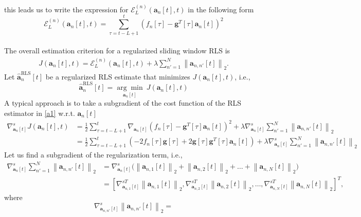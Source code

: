 \documentclass[11pt,final,onecolumn]{IEEEtran}
\begin{document}
\begin{itemize}
this leads us to write the expression for $\mathcal{E}_L^{(n)}(\bm a_n[t],t)$ in the following form
\begin{equation}
\mathcal{E}_L^{(n)}(\bm a_n[t],t)=\sum_{\tau=t-L+1}^{t}\left ( f_n[\tau]- \bm g^T[\tau] \bm a_n[t] \right )^2
\end{equation}\\


The overall estimation criterion for a regularized sliding window RLS  is
\begin{align}
J(\bm a_n[t],t)= \mathcal{E}_L^{(n)}(\bm a_n[t],t)+\lambda \sum_{n'=1}^{N} \left \lVert \bm a_{n,n'}[t]\right\rVert_2. \label{a1}
\end{align}
Let $\hat{\bm a}_n^{\text{RLS}}[t]$ be a regularized RLS estimate that minimizes $J(\bm a_n[t],t)$, i.e.,
\begin{equation}\label{key}
\hat{\bm a}_n^{\text{RLS}}[t]=\underset{\bm a_n[t]}{\arg\min}~J(\bm a_n[t],t)
\end{equation}
A typical approach is to take a subgradient of the cost function of the RLS estimator in \eqref{a1}  w.r.t. $\bm a_n[t]$
\begin{align}\label{key}
\nabla_{\bm a_n[t]}^{s}J(\bm a_n[t],t) &= \frac{1}{2}\sum_{\tau=t-L+1}^{t} \nabla_{\bm a_n[t]} \left ( f_n[\tau]- \bm g^T[\tau] \bm a_n[t] \right )^2+\lambda \nabla_{\bm a_n[t]} ^s \sum_{n'=1}^{N} \left \lVert \bm a_{n,n'}[t]\right\rVert_2\\
&= \frac{1}{2}\sum_{\tau=t-L+1}^{t} \left ( -2f_n[\tau]\bm g[\tau]+2\bm g[\tau]\bm g^T[\tau]\bm a_n[t]\right) + \lambda \nabla_{\bm a_n[t]} ^s \sum_{n'=1}^{N} \left \lVert \bm a_{n,n'}[t]\right\rVert_2
\end{align}
Let us find a subgradient of the regularization term, i.e.,
\begin{align}\label{key}
\nabla_{\bm a_n[t]} ^s \sum_{n'=1}^{N}\left \lVert \bm a_{n,n'}[t]\right\rVert_2 &= \nabla_{\bm a_n[t]} ^s \big (\left \lVert \bm a_{n,1}[t]\right\rVert_2+\left \lVert \bm a_{n,2}[t]\right\rVert_2+ \ldots +\left \lVert \bm a_{n,N}[t]\right\rVert_2 \big ) \\
& =  [ \nabla_{\bm a_{n,1}[t]} ^{sT} \left \lVert \bm a_{n,1}[t]\right\rVert_2, \nabla_{\bm a_{n,2}[t]} ^{sT} \left \lVert \bm a_{n,2}[t]\right\rVert_2, \ldots, \nabla_{\bm a_{n,N}[t]} ^{sT} \left \lVert \bm a_{n,N}[t]\right\rVert_2]^T, \label{eqn19}
\end{align}
where 
\begin{equation}\label{key}
\nabla_{\bm a_{n,n'}[t]} ^s\left \lVert \bm a_{n,n'}[t]\right\rVert_2= 

\end{equation}
\end{itemize}
\end{document}
